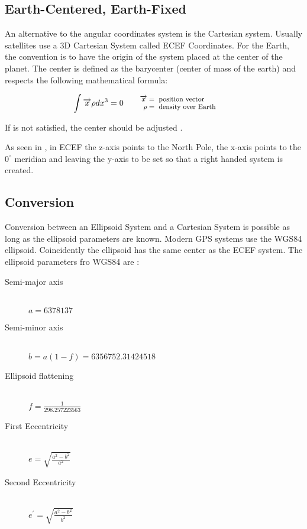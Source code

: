\subsection{Earth-Centered, Earth-Fixed}
\label{sub-sec:ecef}
An alternative to the angular coordinates system is the Cartesian system. Usually
satellites use a 3D Cartesian System called ECEF
Coordinates. For the Earth,  the convention is to have the origin of the system
placed at the center of the planet. The center is defined as the barycenter 
(center of mass of the earth) and respects the following mathematical formula:

\begin{equation}
\int \overrightarrow {x}\rho dx^{3} = 0
\qquad\parbox{4.0cm}{\footnotesize$\begin{aligned} 
  \overrightarrow {x} &= \text{ position vector}
  \\[-1.0ex] \rho &= \text{ density over Earth}
  \end{aligned}$}
\label{eqn:ecef-int}
\end{equation}

If  is not satisfied, the center should
be adjusted \cite{earth-coordinates}.

As seen in , in ECEF the z-axis points to the North
Pole,  the x-axis points to the $0^{\circ}$ meridian and leaving the y-axis to be
set so that a right handed system is created.
\subsection{Conversion}
\label{sub-sec:lla2ecef}
Conversion between an Ellipsoid System and a Cartesian System is possible 
as long as the ellipsoid parameters are known. Modern GPS systems use 
the WGS84 ellipsoid. Coincidently the ellipsoid has the same center as the ECEF
system. The ellipsoid parameters fro WGS84 are \cite{datum}:


\begin{description}
\item [Semi-major axis] \hfill \\
$a = 6378137$
\item [Semi-minor axis] \hfill \\
$b = a(1-f) = 6356752.31424518$
\item [Ellipsoid flattening] \hfill \\
$ f = \frac{1}{298.257223563}$
\item [First Eccentricity] \hfill \\
$e = \sqrt{\frac{a^{2}-b^{2}}{a^{2}}}$
\item [Second Eccentricity] \hfill \\
$e^{'} = \sqrt{\frac{a^{2}-b^{2}}{b^{2}}}$
\end{description}


